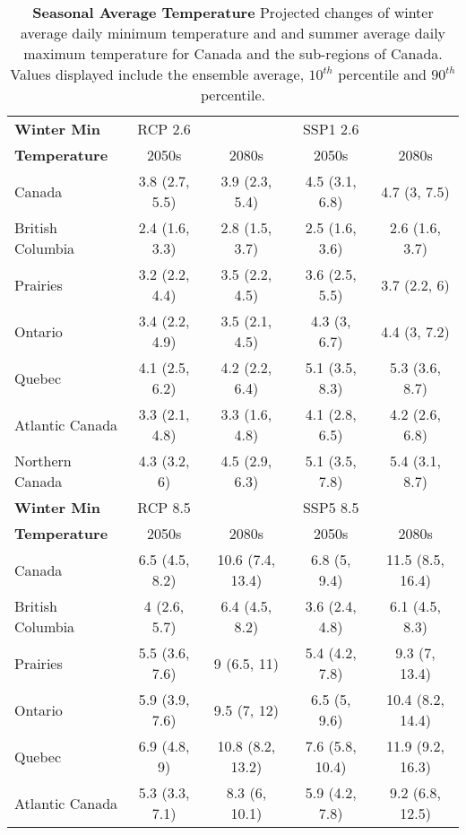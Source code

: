 \documentclass[]{scrartcl}
\begin{document}
\begin{appendices}
\begin{table}[t]
	\caption{\textbf{Seasonal Average Temperature} Projected changes of winter average daily minimum temperature and and summer average daily maximum temperature for Canada and the sub-regions of Canada. Values displayed include the ensemble average, $10^{th}$ percentile and $90^{th}$ percentile.}\label{table:bc_seas_tas}
	\begin{center}
		\begin{tabularx}{\linewidth}{|L|cc|cc|} 
			\hline
			\textbf{Winter Min} & RCP 2.6 & & SSP1 2.6 &   \\
			\textbf{Temperature}                & 2050s & 2080s & 2050s &2080s \\
			\hline
			Canada & 3.8 (2.7, 5.5) & 3.9 (2.3, 5.4) & 4.5 (3.1, 6.8) & 4.7 (3, 7.5) \\ 
			British Columbia & 2.4 (1.6, 3.3) & 2.8 (1.5, 3.7) & 2.5 (1.6, 3.6) & 2.6 (1.6, 3.7) \\ 
			Prairies & 3.2 (2.2, 4.4) & 3.5 (2.2, 4.5) & 3.6 (2.5, 5.5) & 3.7 (2.2, 6) \\ 
			Ontario & 3.4 (2.2, 4.9) & 3.5 (2.1, 4.5) & 4.3 (3, 6.7) & 4.4 (3, 7.2) \\ 
			Quebec & 4.1 (2.5, 6.2) & 4.2 (2.2, 6.4) & 5.1 (3.5, 8.3) & 5.3 (3.6, 8.7) \\ 
			Atlantic Canada & 3.3 (2.1, 4.8) & 3.3 (1.6, 4.8) & 4.1 (2.8, 6.5) & 4.2 (2.6, 6.8) \\ 
			Northern Canada & 4.3 (3.2, 6) & 4.5 (2.9, 6.3) & 5.1 (3.5, 7.8) & 5.4 (3.1, 8.7) \\ 		
			\hline
			\textbf{Winter Min} & RCP 8.5 & & SSP5 8.5 &   \\
			\textbf{Temperature} & 2050s & 2080s & 2050s &2080s \\
			\hline
			Canada & 6.5 (4.5, 8.2) & 10.6 (7.4, 13.4) & 6.8 (5, 9.4) & 11.5 (8.5, 16.4) \\ 
			British Columbia & 4 (2.6, 5.7) & 6.4 (4.5, 8.2) & 3.6 (2.4, 4.8) & 6.1 (4.5, 8.3) \\ 
			Prairies & 5.5 (3.6, 7.6) & 9 (6.5, 11) & 5.4 (4.2, 7.8) & 9.3 (7, 13.4) \\ 
			Ontario & 5.9 (3.9, 7.6) & 9.5 (7, 12) & 6.5 (5, 9.6) & 10.4 (8.2, 14.4) \\ 
			Quebec & 6.9 (4.8, 9) & 10.8 (8.2, 13.2) & 7.6 (5.8, 10.4) & 11.9 (9.2, 16.3) \\ 
			Atlantic Canada & 5.3 (3.3, 7.1) & 8.3 (6, 10.1) & 5.9 (4.2, 7.8) & 9.2 (6.8, 12.5) \\ 

\end{tabularx}
\end{center}
\end{table}
\end{appendices}
\end{document}

